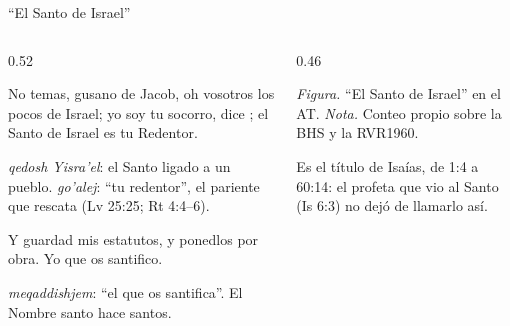 \begin{frame}{``El Santo de Israel''}
\begin{columns}[c,onlytextwidth]
\begin{column}{0.52\textwidth}
\begin{cita}No temas, gusano de Jacob, oh vosotros los pocos de Israel; yo soy tu socorro, dice \SENOR{}; el Santo de Israel es tu Redentor.\end{cita}
\begin{center}\small{}\end{center}
\scriptsize {} \emph{qedosh Yisra'el}: el Santo ligado a un pueblo.  \emph{go'alej}: ``tu redentor'', el pariente que rescata (Lv 25:25; Rt 4:4--6).
\begin{cita}Y guardad mis estatutos, y ponedlos por obra. Yo \SENOR{} que os santifico.\end{cita}
\scriptsize {} \emph{meqaddishjem}: ``el que os santifica''. El Nombre santo hace santos.
\end{column}
\begin{column}{0.46\textwidth}
\centering
{}\par\smallskip
{\tiny\color{gris}\textit{Figura.} ``El Santo de Israel'' en el AT. \textit{Nota.} Conteo propio sobre la BHS y la RVR1960.}\par\medskip
\raggedright\scriptsize Es el título de Isaías, de 1:4 a 60:14: el profeta que vio al Santo (Is 6:3) no dejó de llamarlo así.
\end{column}
\end{columns}
\end{frame}


